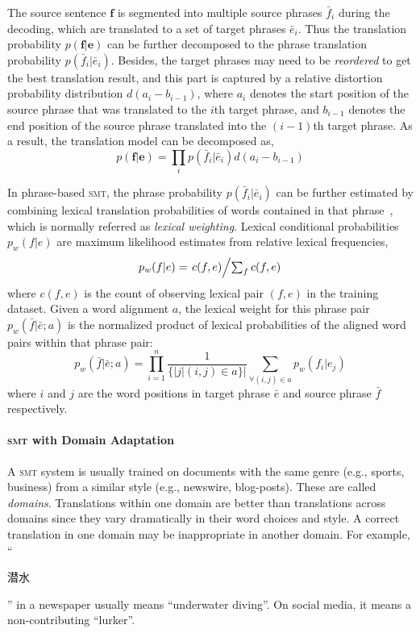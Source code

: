 The source sentence $\mathbf{f}$ is segmented into multiple source phrases $\bar{f}_i$ during the decoding, which are translated to a set of target phrases $\bar{e}_i$. Thus the translation probability $p(\mathbf{f}|\mathbf{e})$ can be further decomposed to the phrase translation probability $p(\bar{f}_i | \bar{e}_i)$. Besides, the target phrases may need to be \textit{reordered} to get the best translation result, and this part is captured by a relative distortion probability distribution $d(a_i - b_{i-1})$, where $a_i$ denotes the start position of the source phrase that was translated to the $i$th target phrase, and $b_{i-1}$ denotes the end position of the source phrase translated into the $(i-1)$th target phrase. As a result, the translation model can be decomposed as,
\begin{equation}
p(\mathbf{f}|\mathbf{e}) = \prod_{i} p(\bar{f}_i | \bar{e}_i) d(a_i - b_{i-1})
\end{equation}

In phrase-based \textsc{smt}, the phrase probability $p(\bar{f}_i | \bar{e}_i)$ can be further estimated by combining lexical translation probabilities of words contained in that phrase~\citep{koehn-03}, which is normally referred as \textit{lexical weighting}. Lexical conditional probabilities $p_w(f|e)$ are maximum likelihood estimates from relative lexical frequencies,
\begin{equation}
\label{eq:lexical_prob}
p_w(f|e) = \textstyle \left.c(f, e)\middle/\sum_f{c(f, e)}\right.
\end{equation}
where $c(f, e)$ is the count of observing lexical pair $(f, e)$ in the training dataset. Given a word alignment $a$, the lexical weight for this phrase pair $p_w(\bar{f} | \bar{e}; a)$ is the normalized product of lexical probabilities of the aligned word pairs within that phrase pair:
\begin{equation}
\label{eq:phrase_prob}
p_w(\bar{f} | \bar{e}; a) = \prod^{n}_{i=1} \frac{1}{\{|j | (i, j) \in a\}|} \sum_{\forall (i,j) \in a} p_w(f_i | e_j)
\end{equation}
where $i$ and $j$ are the word positions in target phrase $\bar{e}$ and source phrase $\bar{f}$ respectively.

\paragraph{\textsc{smt} with Domain Adaptation}

A \textsc{smt} system is usually trained on documents with the same genre (e.g., sports, business) from a similar style (e.g., newswire, blog-posts).  These are called \emph{domains}.  Translations within one domain are better than translations across domains since they vary dramatically in their word choices and style.  A correct translation in one domain may be inappropriate in another domain.  For example, ``\begin{CJK*}{UTF8}{gbsn}潜水\end{CJK*}'' in a newspaper usually means ``underwater diving''.  On social media, it means a non-contributing ``lurker''.

